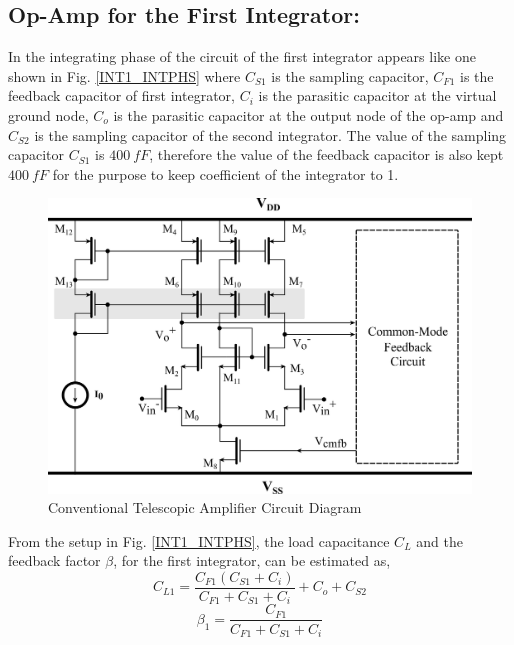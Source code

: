 \subsection{Op-Amp for the First Integrator:}
In the integrating phase of the circuit of the first integrator appears like one shown in Fig. \ref{INT1_INTPHS} where $C_{S1}$ is the sampling capacitor, $C_{F1}$ is the feedback capacitor of first integrator, $C_{i}$ is the parasitic capacitor at the virtual ground node, $C_{o}$ is the parasitic capacitor at the output node of the op-amp and $C_{S2}$ is the sampling capacitor of the second integrator. The value of the sampling capacitor $C_{S1}$ is $400\ fF$, therefore the value of the feedback capacitor is also kept $400\ fF$ for the purpose to keep coefficient of the integrator to 1. 
%
\begin{figure}[h]
\centering
\includegraphics[width=0.85\columnwidth]{Chap05/Figures/telescopic.png}
\caption{Conventional Telescopic Amplifier Circuit Diagram}
\label{fig:TELE_AMP}
\end{figure}
%

From the setup in Fig. \ref{INT1_INTPHS}, the load capacitance $C_L$ and the feedback factor $\beta$, for the first integrator, can be estimated as,
\begin{equation}
    C_{L1}=\frac{C_{F1}\left(C_{S1}+C_{i}\right)}{C_{F1}+C_{S1}+C_{i}}+C_{o}+C_{S2}
    \label{CL1}
\end{equation}
\begin{equation}
    \beta_{1}=\frac{C_{F1}}{C_{F1}+C_{S1}+C_{i}}
    \label{BETA1}
\end{equation}

